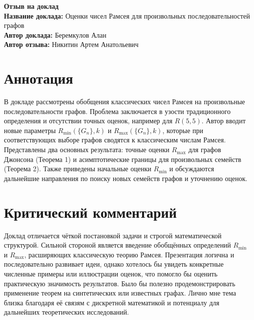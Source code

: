 \documentclass[11pt]{article}
\begin{document}
\begin{center}
    {\Large \textbf{Отзыв на доклад}}\\[1em]
    {\large \textbf{Название доклада:} Оценки чисел Рамсея для произвольных последовательностей графов}\\[0.5em]
    {\large \textbf{Автор доклада:} Беремкулов Алан}\\[0.5em]
    {\large \textbf{Автор отзыва:} Никитин Артем Анатольевич}\\[2em]
\end{center}

\section*{Аннотация}
В докладе рассмотрены обобщения классических чисел Рамсея на произвольные последовательности графов. Проблема заключается
в узости традиционного определения и отсутствии точных оценок, например для \(R(5,5)\). Автор вводит новые параметры
\(R_{\min}(\{G_n\},k)\) и \(R_{\max}(\{G_n\},k)\), которые при соответствующих выборе графов сводятся к классическим
числам Рамсея. Представлены два основных результата: точные оценки \(R_{\max}\) для графов Джонсона (Теорема 1) и
асимптотические границы для произвольных семейств (Теорема 2). Также приведены начальные оценки \(R_{\min}\) и
обсуждаются дальнейшие направления по поиску новых семейств графов и уточнению оценок.

\section*{Критический комментарий}
Доклад отличается чёткой постановкой задачи и строгой математической структурой. Сильной стороной является введение
обобщённых определений \(R_{\min}\) и \(R_{\max}\), расширяющих классическую теорию Рамсея. Презентация логична и
последовательно развивает идеи, однако хотелось бы увидеть конкретные численные примеры или иллюстрации оценок, что помогло 
бы оценить практическую значимость результатов. Было бы полезно продемонстрировать применение теорем на синтетических или 
известных графах. Лично мне тема близка благодаря её связям с дискретной математикой и потенциалу для дальнейших теоретических 
исследований.
\end{document}
